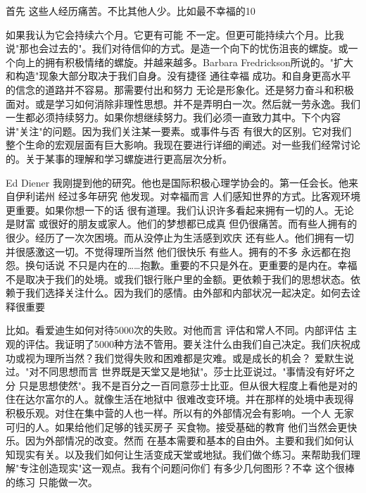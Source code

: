 首先 这些人经历痛苦。不比其他人少。比如最不幸福的10%

如果我认为它会持续六个月。它更有可能 不一定。但更可能持续六个月。比我说"那也会过去的"。我们对待信仰的方式。是造一个向下的忧伤沮丧的螺旋。或一个向上的拥有积极情绪的螺旋。并越来越多。Barbara Fredrickson所说的。"扩大和构造"现象大部分取决于我们自身。没有捷径 通往幸福 成功。和自身更高水平的信念的道路并不容易。那需要付出和努力 无论是形象化。还是努力奋斗和积极面对。或是学习如何消除非理性思想。并不是弄明白一次。然后就一劳永逸。我们一生都必须持续努力。如果你想继续努力。我们必须一直致力其中。下个内容 讲"关注"的问题。因为我们关注某一要素。或事件与否 有很大的区别。它对我们整个生命的宏观层面有巨大影响。我现在要进行详细的阐述。对一些我们经常讨论的。关于某事的理解和学习螺旋进行更高层次分析。 

Ed Diener 我刚提到他的研究。他也是国际积极心理学协会的。第一任会长。他来自伊利诺州 经过多年研究 他发现。对幸福而言 人们感知世界的方式。比客观环境更重要。如果你想一下的话 很有道理。我们认识许多看起来拥有一切的人。无论是财富 或很好的朋友或家人。他们的梦想都已成真 但仍很痛苦。而有些人拥有的很少。经历了一次次困境。而从没停止为生活感到欢庆 还有些人。他们拥有一切并很感激这一切。不觉得理所当然 他们很快乐 有些人。拥有的不多 永远都在抱怨。换句话说 不只是内在的……抱歉。重要的不只是外在。更重要的是内在。幸福不是取决于我们的处境。或我们银行账户里的金额。更依赖于我们的思想状态。依赖于我们选择关注什么。因为我们的感情。由外部和内部状况一起决定。如何去诠释很重要 

比如。看爱迪生如何对待5000次的失败。对他而言 评估和常人不同。内部评估 主观的评估。我证明了5000种方法不管用。要关注什么由我们自己决定。我们庆祝成功或视为理所当然？我们觉得失败和困难都是灾难。或是成长的机会？ 爱默生说过。"对不同思想而言 世界既是天堂又是地狱"。莎士比亚说过。"事情没有好坏之分 只是思想使然"。我不是百分之一百同意莎士比亚。但从很大程度上看他是对的 住在达尔富尔的人。就像生活在地狱中 很难改变环境。并在那样的处境中表现得积极乐观。对住在集中营的人也一样。所以有的外部情况会有影响。一个人 无家可归的人。如果给他们足够的钱买房子 买食物。接受基础的教育 他们当然会更快乐。因为外部情况的改变。然而 在基本需要和基本的自由外。主要和我们如何认知现实有关。以及我们如何让生活变成天堂或地狱。我们做个练习。来帮助我们理解"专注创造现实"这一观点。我有个问题问你们 有多少几何图形？不幸 这个很棒的练习 只能做一次。 

